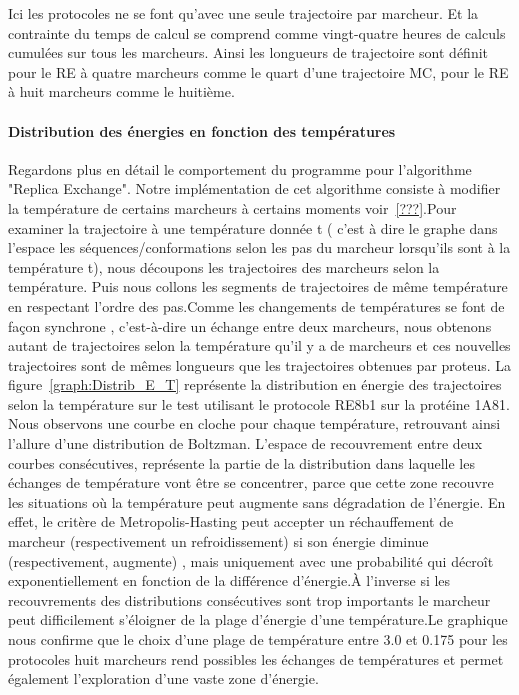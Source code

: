 Ici les protocoles ne se font qu'avec une seule trajectoire par marcheur. Et la contrainte du temps de calcul se comprend comme vingt-quatre heures de calculs cumulées sur tous les marcheurs.
Ainsi les longueurs de trajectoire sont définit pour le RE à quatre marcheurs comme le quart d'une trajectoire MC, pour le RE à huit marcheurs comme le huitième.


\paragraph{Distribution des énergies en fonction des températures}

Regardons plus en détail le comportement du programme pour l'algorithme "Replica Exchange". Notre implémentation de cet algorithme consiste à modifier la température de certains marcheurs à certains moments voir~\ref{???}.Pour examiner la trajectoire à une température donnée t ( c'est à dire le graphe dans l'espace les séquences/conformations selon les pas du marcheur lorsqu'ils sont à la température t), nous découpons les trajectoires des marcheurs  selon la température. Puis nous collons les segments de trajectoires de même température en respectant l'ordre des pas.Comme les changements de températures se font de façon synchrone , c’est-à-dire un échange entre deux marcheurs, nous obtenons autant de trajectoires selon la température qu'il y a de marcheurs et ces nouvelles trajectoires sont de mêmes longueurs que les trajectoires obtenues par proteus. La figure~\ref{graph:Distrib_E_T} représente la distribution en énergie des trajectoires selon la température sur le test utilisant le protocole RE8b1 sur la protéine 1A81. Nous observons une courbe en cloche pour chaque température, retrouvant ainsi l'allure d'une distribution de Boltzman.  L'espace de recouvrement entre deux courbes consécutives, représente la partie de la distribution dans laquelle les échanges de température vont être se concentrer, parce que cette zone recouvre les situations où la température peut augmente sans dégradation de l'énergie. En effet, le critère de Metropolis-Hasting peut accepter un réchauffement de marcheur (respectivement un refroidissement) si son énergie diminue  (respectivement, augmente) , mais uniquement avec une probabilité qui décroît exponentiellement en fonction de la différence d'énergie.À l'inverse si les recouvrements des distributions consécutives sont trop importants le marcheur peut difficilement s'éloigner de la plage d'énergie d'une température.Le graphique nous confirme que le choix d'une plage de température entre 3.0 et 0.175 pour les protocoles huit marcheurs rend possibles les échanges de températures et permet également l'exploration d'une vaste zone d'énergie.   




